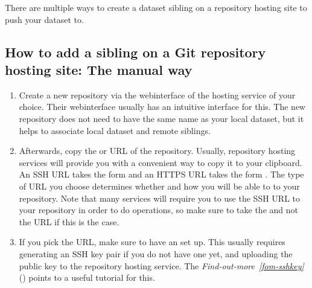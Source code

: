 \sphinxAtStartPar
There are multiple ways to create a dataset sibling on a repository hosting site to push your dataset to.


\subsection{How to add a sibling on a Git repository hosting site: The manual way}
\label{\detokenize{basics/101-139-hostingservices:how-to-add-a-sibling-on-a-git-repository-hosting-site-the-manual-way}}\begin{enumerate}
%
\item {} 
\sphinxAtStartPar
Create a new repository via the webinterface of the hosting service of your choice. Their webinterface usually has an intuitive interface for this.
The new repository does not need to have the same name as your local dataset, but it helps to associate local dataset and remote siblings.

\item {} 
\sphinxAtStartPar
Afterwards, copy the {\hyperref[\detokenize{glossary:term-SSH}]{}} or {\hyperref[\detokenize{glossary:term-https}]{}} URL of the repository. Usually, repository hosting services will provide you with a convenient way to copy it to your clipboard. An SSH URL takes the form  and an HTTPS URL takes the form . The type of URL you choose determines whether and how you will be able to  to your repository. Note that many services will require you to use the SSH URL to your repository in order to do  operations, so make sure to take the {\hyperref[\detokenize{glossary:term-SSH}]{}} and not the {\hyperref[\detokenize{glossary:term-https}]{}} URL if this is the case.

\item {} 
\sphinxAtStartPar
If you pick the {\hyperref[\detokenize{glossary:term-SSH}]{}} URL, make sure to have an {\hyperref[\detokenize{glossary:term-SSH-key}]{}} set up. This usually requires generating an SSH key pair if you do not have one yet, and uploading the public key to the repository hosting service. The \textit{Find-out-more}~{\findoutmoreiconinline}\textit{\ref{fom-sshkey}} {\hyperref[\detokenize{basics/101-139-hostingservices:fom-sshkey}]{}} () points to a useful tutorial for this.


\end{enumerate}
